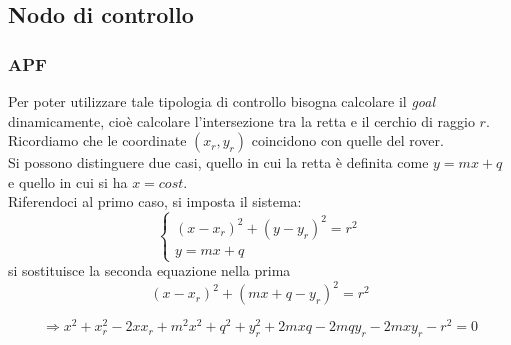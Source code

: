   
\subsection{Nodo di controllo}
\subsubsection{APF}
Per poter utilizzare tale tipologia di controllo bisogna calcolare il \textit{goal} dinamicamente, cioè calcolare l'intersezione tra la retta e il cerchio di raggio $r$. Ricordiamo che le coordinate $(x_r,y_r)$ coincidono con quelle del rover. \\
Si possono distinguere due casi, quello in cui la retta è definita come $y=mx+q$ e quello in cui si ha $x=cost$.\\
Riferendoci al primo caso, si imposta il sistema:
\begin{equation} 
\begin{cases}

    (x-x_r)^2+(y-y_r)^2=r^2
   \\
    y=mx+q 
  \end{cases} 
\end{equation}
si sostituisce la seconda equazione nella prima
\begin{equation*}
(x-x_r)^2+(mx+q-y_r)^2=r^2
\end{equation*}

\begin{equation}
\Rightarrow x^2+x_r^2-2xx_r+m^2x^2+q^2+y_r^2+2mxq-2mqy_r-2mxy_r-r^2=0
\end{equation}

